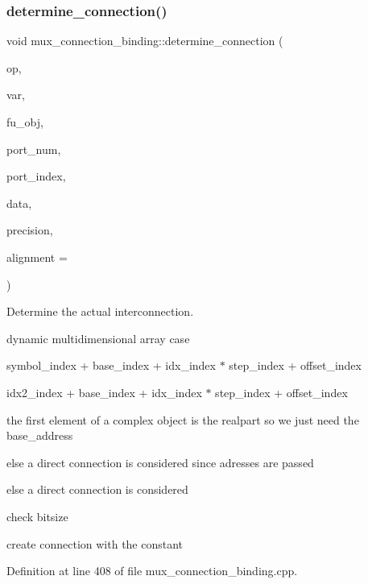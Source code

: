 \subsubsection{\texorpdfstring{determine\+\_\+connection()}{determine\_connection()}}
{\footnotesize\ttfamily void mux\+\_\+connection\+\_\+binding\+::determine\+\_\+connection (\begin{DoxyParamCaption}\item[{const \hyperlink{graph_8hpp_abefdcf0544e601805af44eca032cca14}{vertex} \&}]{op,  }\item[{const \hyperlink{classHLS__manager_a972627cc658afa992590b9d2bf1a1e87}{H\+L\+S\+\_\+manager\+::io\+\_\+binding\+\_\+type} \&}]{var,  }\item[{\hyperlink{generic__obj_8hpp_acb533b2ef8e0fe72e09a04d20904ca81}{generic\+\_\+obj\+Ref}}]{fu\+\_\+obj,  }\item[{unsigned int}]{port\+\_\+num,  }\item[{unsigned int}]{port\+\_\+index,  }\item[{const \hyperlink{op__graph_8hpp_a9a0b240622c47584bee6951a6f5de746}{Op\+Graph\+Const\+Ref}}]{data,  }\item[{unsigned int}]{precision,  }\item[{unsigned int}]{alignment = {} }\end{DoxyParamCaption})\hspace{0.3cm}{\ttfamily [private]}}



Determine the actual interconnection. 

dynamic multidimensional array case

symbol\+\_\+index + base\+\_\+index + idx\+\_\+index $\ast$ step\+\_\+index + offset\+\_\+index

idx2\+\_\+index + base\+\_\+index + idx\+\_\+index $\ast$ step\+\_\+index + offset\+\_\+index

the first element of a complex object is the realpart so we just need the base\+\_\+address

else a direct connection is considered since adresses are passed

else a direct connection is considered

check bitsize

create connection with the constant 

Definition at line 408 of file mux\+\_\+connection\+\_\+binding.\+cpp.




